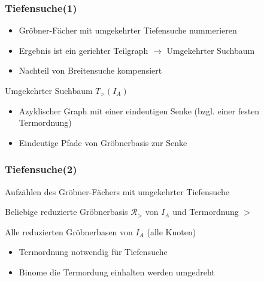\documentclass{beamer}
\newcommand{\Input}{\item[\algorithmicinput]}
\newcommand{\algorithmicinput}{\textbf{Input:}}
\newcommand{\Output}{\item[\algorithmicoutput]}
\newcommand{\algorithmicoutput}{\textbf{Output:}}
\begin{document}

\begin{frame}[<+->][fragile]
\frametitle{Tiefensuche(1)}

\begin{itemize}
\item Gröbner-Fächer mit umgekehrter Tiefensuche nummerieren
\item Ergebnis ist ein gerichter Teilgraph $\longrightarrow$ Umgekehrter Suchbaum 
\item Nachteil von Breitensuche kompensiert

\end{itemize}

\begin{block}{Umgekehrter Suchbaum $T_{>}(I_{A})$}
\begin{itemize}
\item Azyklischer Graph mit einer eindeutigen Senke (bzgl. einer festen Termordnung)
\item Eindeutige Pfade von Gröbnerbasis zur Senke
\end{itemize}

\end{block}
 
\end{frame}



\begin{frame}[fragile]
\frametitle{Tiefensuche(2)}


\begin{algorithm}[H]
\caption{Aufzählen des Gröbner-Fächers mit umgekehrter Tiefensuche}

\begin{algorithmic}[1]

\Input
Beliebige reduzierte Gröbnerbasis  $ \mathcal{R}_{>} $ von $I_A$ und Termordnung $>$

\Output
Alle reduzierten Gröbnerbasen von $I_A$ (alle Knoten) 


\end{algorithmic}
\end{algorithm}

\begin{itemize}
\item Termordnung notwendig für Tiefensuche
\item Binome die Termordung einhalten werden \glqq umgedreht\grqq
\end{itemize}

 
\end{frame}
\end{document}

